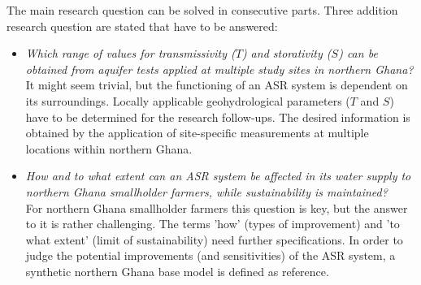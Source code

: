 The main research question can be solved in consecutive parts. Three addition research question are stated that have to be answered:

\begin{itemize}
\item{\textit{Which range of values for transmissivity ($T$) and storativity ($S$) can be obtained from aquifer tests applied at multiple study sites in northern Ghana?}
\smallskip \\
It might seem trivial, but the functioning of an ASR system is dependent on its surroundings. Locally applicable geohydrological parameters ($T$ and $S$) have to be determined for the research follow-ups. The desired information is obtained by the application of site-specific measurements at multiple locations within northern Ghana.} 
\end{itemize} 

\begin{itemize} 
\item{\textit{How and to what extent can an ASR system be affected in its water supply to northern Ghana smallholder farmers, while sustainability is maintained?} 
\smallskip \\
For northern Ghana smallholder farmers this question is key, but the answer to it is rather challenging. The terms 'how' (types of improvement) and 'to what extent' (limit of sustainability) need further specifications. In order to judge the potential improvements (and sensitivities) of the ASR system, a synthetic northern Ghana base model is defined as reference.}
\end{itemize}

